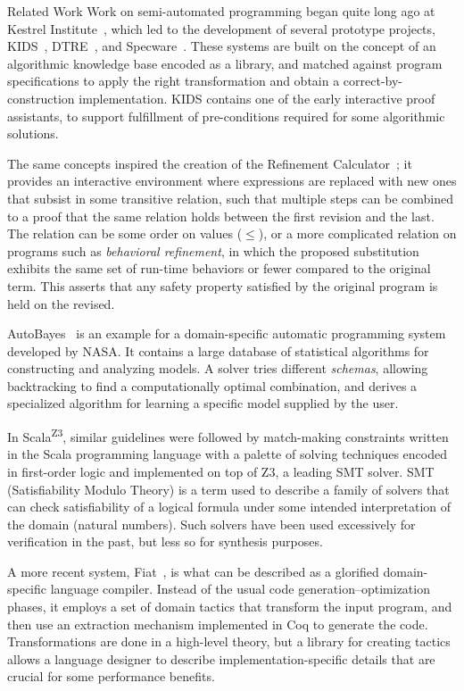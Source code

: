 \begin{paragraph}{Related Work}
Work on semi-automated programming began quite long ago at Kestrel Institute~\cite{AI1985/Smith},
which led to the development of several prototype projects,
KIDS~\cite{TSE1990/Smith}, DTRE~\cite{CPS1991/Blaine}, 
and Specware~\cite{2001/McDonald:specware}.
These systems are built on the concept of an algorithmic knowledge base encoded
as a library, and matched against program specifications to apply the
right transformation and obtain a correct-by-construction implementation.
KIDS contains one of the early interactive proof assistants, to support
fulfillment of pre-conditions required for some algorithmic solutions.

The same concepts inspired the creation of the Refinement Calculator~\cite{TPHOLs1996/Butler};
it provides an interactive environment where expressions are replaced with
new ones that subsist in some transitive relation, such that multiple steps
can be combined to a proof that the same relation holds between the first
revision and the last.
The relation can be some order on values ($\leq$), or a more complicated relation
on programs such as \emph{behavioral refinement}, in which the proposed substitution
exhibits the same set of run-time behaviors or fewer compared to the original
term.
This asserts that any safety property satisfied by the original program is held
on the revised.

AutoBayes~\cite{JFP2003/Fischer} is an example for a domain-specific automatic programming system
developed by NASA.
It contains a large database of statistical algorithms for constructing and
analyzing models.
A solver tries different \emph{schemas}, allowing backtracking to find
a computationally optimal combination, and derives a specialized algorithm
for learning a specific model supplied by the user.

In Scala\textsuperscript{Z3}, similar guidelines were followed by match-making
constraints written in the Scala programming language with a palette of
solving techniques encoded in first-order logic and implemented on top of
Z3, a leading SMT solver. SMT (Satisfiability Modulo Theory) is a term used
to describe a family of solvers that can check satisfiability of a logical
formula under some intended interpretation of the domain (\eg natural numbers).
Such solvers have been used excessively for verification in the past,
but less so for synthesis purposes.

A more recent system, Fiat~\cite{POPL2015/Delaware}, is what can be described
as a glorified domain-specific language compiler.
Instead of the usual code generation--optimization phases, it employs a set
of domain tactics that transform the input program, and then use an extraction
mechanism implemented in Coq to generate the code.
Transformations are done in a high-level theory, but a library for creating
tactics allows a language designer to describe implementation-specific details
that are crucial for some performance benefits.


\end{paragraph}

